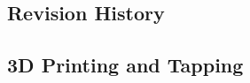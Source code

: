 \documentclass[
10pt, %
letterpaper, %
oneside, %
headinclude,footinclude, %
BCOR5mm, %
]{scrartcl}
\begin{document}
\subsection{Revision History}


\subsection{3D Printing and Tapping}


\renewcommand{\refname}{\spacedlowsmallcaps{References}} %




\end{document}
